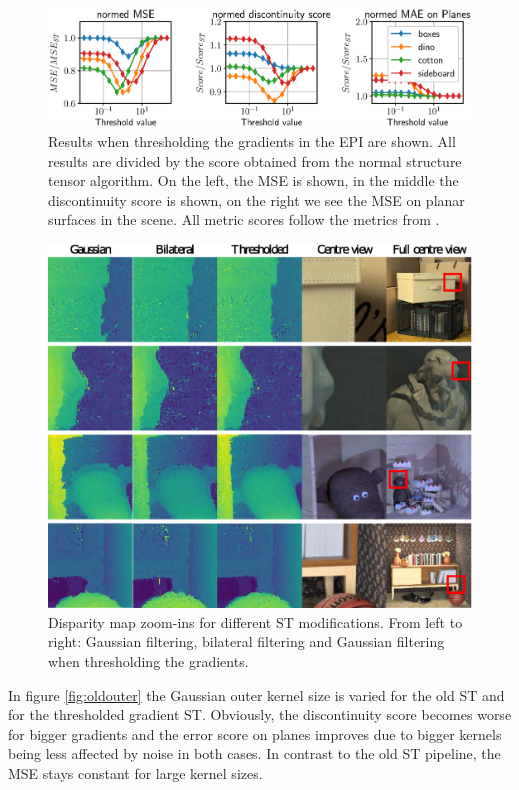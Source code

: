 \documentclass  [
  paper    = a4,
  BCOR     = 10mm,
  twoside,
  fontsize = 12pt,
  fleqn,
  toc      = bibnumbered,
  toc      = listofnumbered,
  numbers  = noendperiod,
  headings = normal,
  listof   = leveldown,
  version  = 3.03
]                                       {scrreprt}
\begin{document}
\begin{figure}[h!]
	\centering
	\includegraphics[width=1\linewidth]{images/thresh_params}
	\caption[Results when thresholding the gradients in the EPI]{Results when thresholding the gradients in the EPI are shown. All results are divided by the score obtained from the normal structure tensor algorithm. On the left, the MSE is shown, in the middle the discontinuity score is shown, on the right we see the MSE on planar surfaces in the scene. All metric scores follow the metrics from \cite{honauer2016benchmark}. }
	\label{fig:threshparams}
\end{figure}
\begin{figure}[h!]
	\centering
	\includegraphics[width=0.7\linewidth]{images/thresh_results}
	\caption[Disparity map zoom-ins for different methods]{Disparity map zoom-ins for different ST modifications. From left to right: Gaussian filtering, bilateral filtering and Gaussian filtering when thresholding the gradients.}
	\label{fig:threshresults}
\end{figure}
In figure \ref{fig:oldouter} the Gaussian outer kernel size is varied for the old ST and for the thresholded gradient ST. Obviously, the discontinuity score becomes worse for bigger gradients and the error score on planes improves due to bigger kernels being less affected by noise in both cases. In contrast to the old ST pipeline, the MSE stays constant for large kernel sizes.
\end{document}
